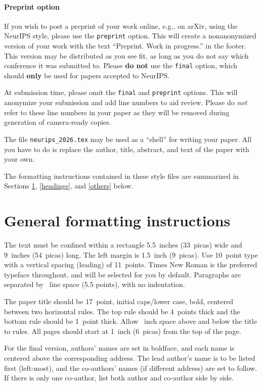 \documentclass{article}
\begin{document}
\paragraph{Preprint option}
If you wish to post a preprint of your work online, e.g., on arXiv, using the NeurIPS style, please use the \verb+preprint+ option. This will create a nonanonymized version of your work with the text ``Preprint. Work in progress.'' in the footer. This version may be distributed as you see fit, as long as you do not say which conference it was submitted to. Please \textbf{do not} use the \verb+final+ option, which should \textbf{only} be used for papers accepted to NeurIPS.


At submission time, please omit the \verb+final+ and \verb+preprint+ options. This will anonymize your submission and add line numbers to aid review. Please do \emph{not} refer to these line numbers in your paper as they will be removed during generation of camera-ready copies.


The file \verb+neurips_2026.tex+ may be used as a ``shell'' for writing your paper. All you have to do is replace the author, title, abstract, and text of the paper with your own.


The formatting instructions contained in these style files are summarized in Sections \ref{gen_inst}, \ref{headings}, and \ref{others} below.


\section{General formatting instructions}
\label{gen_inst}


The text must be confined within a rectangle 5.5~inches (33~picas) wide and
9~inches (54~picas) long. The left margin is 1.5~inch (9~picas).  Use 10~point
type with a vertical spacing (leading) of 11~points.  Times New Roman is the
preferred typeface throughout, and will be selected for you by default.
Paragraphs are separated by ~line space (5.5 points), with no
indentation.


The paper title should be 17~point, initial caps/lower case, bold, centered
between two horizontal rules. The top rule should be 4~points thick and the
bottom rule should be 1~point thick. Allow ~inch space above and
below the title to rules. All pages should start at 1~inch (6~picas) from the
top of the page.


For the final version, authors' names are set in boldface, and each name is
centered above the corresponding address. The lead author's name is to be listed
first (left-most), and the co-authors' names (if different address) are set to
follow. If there is only one co-author, list both author and co-author side by
side.
\end{document}
